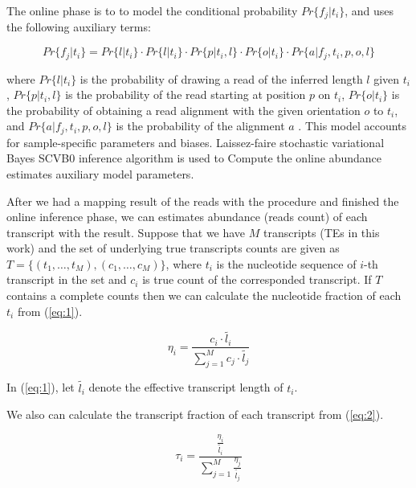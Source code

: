 \documentclass{ws-procs11x85}
\begin{document}
The online phase is to  to model the conditional probability $Pr \{f_j | t_i \}$, and
uses the following auxiliary terms:

\begin{equation}
Pr \{f_j | t_i \} = Pr \{ l | t_i \} 
\cdot Pr \{ l | t_i \} 
\cdot Pr \{ p | t_i, l \} 
\cdot Pr \{ o | t_i \} 
\cdot Pr \{ a | f_j, t_i, p, o, l \} 
\end{equation}

where $Pr \{ l | t_i \}$ 
is the probability of drawing a read of the inferred length $l$ given $t_i$,  
$Pr \{ p | t_i, l \}$ is the probability of the read starting at position $p$ on $t_i$,
$Pr \{ o | t_i \}$ is the probability of obtaining a read
alignment with the given orientation $o$ to $t_i$, and
$Pr \{ a | f_j, t_i, p, o, l \} $ is the probability of the alignment $a$ \cite{patro2017salmon}. 
This model accounts for sample-specific parameters and biases.
Laissez-faire stochastic variational Bayes SCVB0 inference algorithm is used to 
Compute the online abundance estimates auxiliary model parameters\cite{patro2017salmon}.

After we had a mapping result of the reads with the procedure and finished the online inference phase, 
we can estimates abundance (reads count) of each transcript with the result. Suppose that
we have $M$ transcripts (TEs in this work) and the set of underlying true transcripts counts are given as
$T = \{(t_1, \dots , t_M), (c_1, \dots, c_M) \}$, where $t_i$ is the nucleotide sequence of $i$-th transcript in the set and $c_i$ is true count of the corresponded transcript. 
If $T$ contains a complete counts then we can calculate the nucleotide fraction \cite{li2009rna} of each $t_i$ from (\ref{eq:1}).
 

\begin{equation} \label{eq:1}
\eta_i = \frac{c_i \cdot \widetilde{l_i} }{\sum_{j=1}^{M} c_j \cdot \widetilde{l_j}}
\end{equation}

In (\ref{eq:1}), let $\widetilde{l_i}$ denote the effective transcript length of $t_i$\cite{li2009rna}.

We also can calculate the transcript fraction of each transcript from (\ref{eq:2}).

\begin{equation} \label{eq:2}
\tau_i = \frac{ \frac{\eta_i }{\widetilde{l_i}} }
{\sum_{j=1}^{M} \frac{\eta_j }{\widetilde{l_j}} }
\end{equation}
\end{document}
